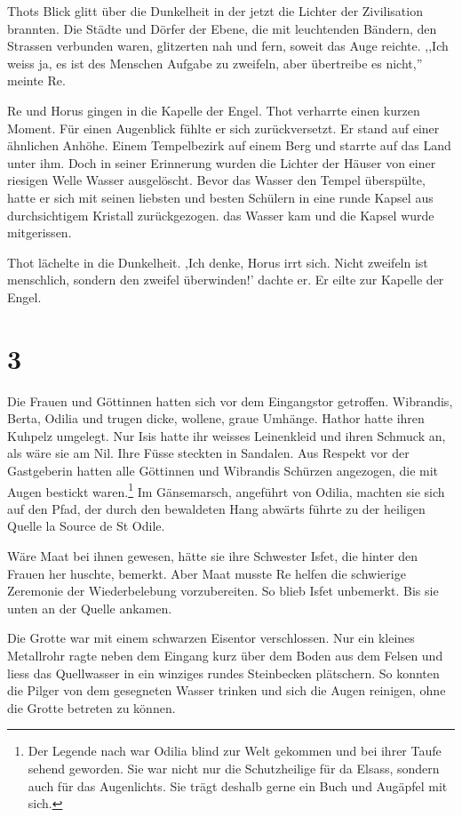 Thots Blick glitt über die Dunkelheit in der jetzt die Lichter der Zivilisation brannten. Die Städte und Dörfer der Ebene, die mit leuchtenden Bändern, den Strassen verbunden waren, glitzerten nah und fern, soweit das Auge reichte. ,,Ich weiss ja, es ist des Menschen Aufgabe zu zweifeln, aber übertreibe es nicht,'' meinte Re.

Re und Horus gingen in die Kapelle der Engel. Thot verharrte einen kurzen Moment. Für einen Augenblick fühlte er sich zurückversetzt. Er stand auf einer ähnlichen Anhöhe. Einem Tempelbezirk auf einem Berg und starrte auf das Land unter ihm. Doch in seiner Erinnerung wurden die Lichter der Häuser von einer riesigen Welle Wasser ausgelöscht. Bevor das Wasser den Tempel überspülte, hatte er sich mit seinen liebsten und besten Schülern in eine runde Kapsel aus durchsichtigem Kristall zurückgezogen. das Wasser kam und die Kapsel wurde mitgerissen. 

Thot lächelte in die Dunkelheit. ,Ich denke, Horus irrt sich. Nicht zweifeln ist menschlich, sondern den zweifel überwinden!' dachte er. Er eilte zur Kapelle der Engel.

\section*{3}

Die Frauen und Göttinnen hatten sich vor dem Eingangstor getroffen. Wibrandis, Berta, Odilia und \am trugen dicke, wollene, graue Umhänge. Hathor hatte ihren Kuhpelz umgelegt. Nur Isis hatte ihr weisses Leinenkleid und ihren Schmuck an, als wäre sie am Nil. Ihre Füsse steckten in Sandalen. Aus Respekt vor der Gastgeberin hatten alle Göttinnen und Wibrandis Schürzen angezogen, die mit Augen bestickt waren.\footnote{Der Legende nach war Odilia blind zur Welt gekommen und bei ihrer Taufe sehend geworden. Sie war nicht nur die Schutzheilige für da Elsass, sondern auch für das Augenlichts. Sie trägt deshalb gerne ein Buch und Augäpfel mit sich.} Im Gänsemarsch, angeführt von Odilia, machten sie sich auf den Pfad, der durch den bewaldeten Hang abwärts führte zu der heiligen Quelle la Source de St Odile.

Wäre Maat bei ihnen gewesen, hätte sie ihre Schwester Isfet, die hinter den Frauen her huschte, bemerkt. Aber Maat musste Re helfen die schwierige Zeremonie der Wiederbelebung vorzubereiten. So blieb Isfet unbemerkt. Bis sie unten an der Quelle ankamen. 

Die Grotte war mit einem schwarzen Eisentor verschlossen. Nur ein kleines Metallrohr ragte neben dem Eingang kurz über dem Boden aus dem Felsen und liess das Quellwasser in ein winziges rundes Steinbecken plätschern. So konnten die Pilger von dem gesegneten Wasser trinken und sich die Augen reinigen, ohne die Grotte betreten zu können. 

